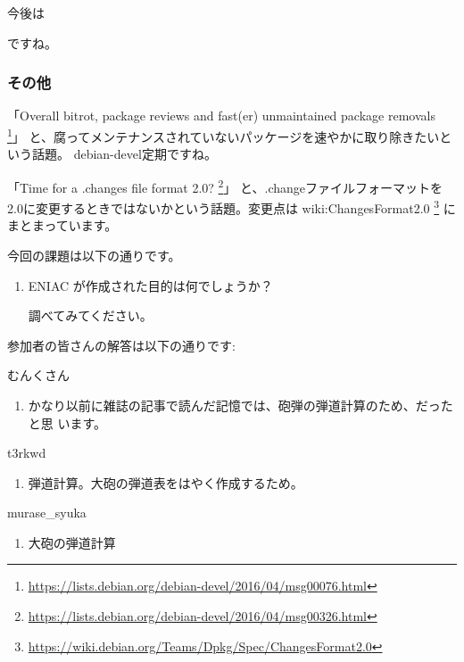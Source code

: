\documentclass[mingoth,a4paper]{jsarticle}
\begin{document}
今後は
ですね。

\subsubsection{その他}
「Overall bitrot, package reviews and fast(er) unmaintained package removals%
\footnote{\url{https://lists.debian.org/debian-devel/2016/04/msg00076.html}}」
と、腐ってメンテナンスされていないパッケージを速やかに取り除きたいという話題。
debian-devel定期ですね。

「Time for a .changes file format 2.0?%
\footnote{\url{https://lists.debian.org/debian-devel/2016/04/msg00326.html}}」
と、.changeファイルフォーマットを2.0に変更するときではないかという話題。変更点は
wiki:ChangesFormat2.0%
\footnote{\url{https://wiki.debian.org/Teams/Dpkg/Spec/ChangesFormat2.0}}
にまとまっています。



今回の課題は以下の通りです。
\begin{screen}
  \begin{enumerate}
  \item %
    ENIAC が作成された目的は何でしょうか？

    調べてみてください。
  \end{enumerate}
\end{screen}

参加者の皆さんの解答は以下の通りです:

\begin{prework}{ むんくさん }
  \begin{enumerate}
  \item かなり以前に雑誌の記事で読んだ記憶では、砲弾の弾道計算のため、だったと思
    います。
  \end{enumerate}
\end{prework}

\begin{prework}{ t3rkwd }
  \begin{enumerate}
  \item 弾道計算。大砲の弾道表をはやく作成するため。
  \end{enumerate}
\end{prework}

\begin{prework}{ murase\_syuka }
  \begin{enumerate}
  \item 大砲の弾道計算
  \end{enumerate}
\end{prework}
\end{document}
